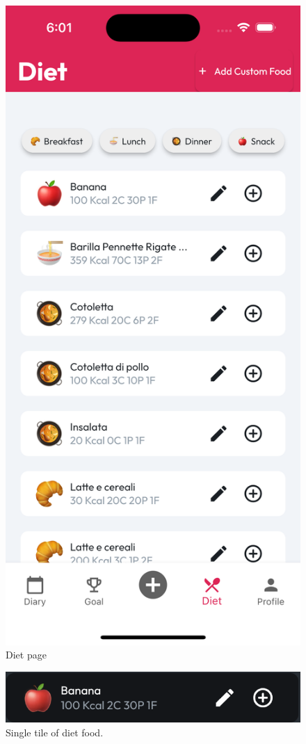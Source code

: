 \documentclass{Configuration_Files/PoliMi3i_thesis}
\begin{document}
\begin{figure}[!h]
  \includegraphics[scale=0.1]{Images/Screenshots/Mobile/DietLight.png}
  \caption{Diet page}
\end{figure}

\begin{figure}[!h]
    \centering
    \includegraphics[scale=0.7]{Images/Screenshots/Mobile/DietFoodItem.png}
    \caption{Single tile of diet food.}
\end{figure}
\end{document}
